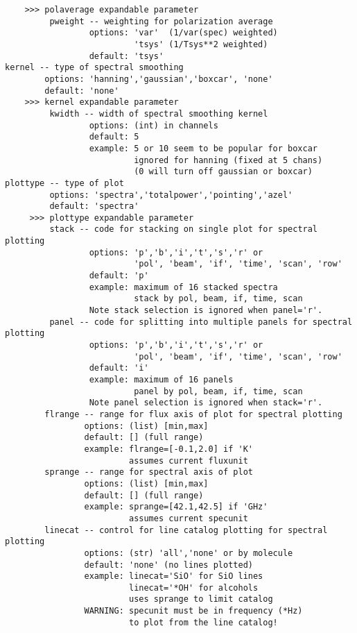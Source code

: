 \begin{verbatim}
    >>> polaverage expandable parameter
         pweight -- weighting for polarization average
                 options: 'var'  (1/var(spec) weighted)
                          'tsys' (1/Tsys**2 weighted)
                 default: 'tsys'
kernel -- type of spectral smoothing
        options: 'hanning','gaussian','boxcar', 'none'
        default: 'none'
    >>> kernel expandable parameter
         kwidth -- width of spectral smoothing kernel
                 options: (int) in channels
                 default: 5
                 example: 5 or 10 seem to be popular for boxcar
                          ignored for hanning (fixed at 5 chans)
                          (0 will turn off gaussian or boxcar)
plottype -- type of plot
         options: 'spectra','totalpower','pointing','azel'
         default: 'spectra'
     >>> plottype expandable parameter
         stack -- code for stacking on single plot for spectral plotting
                 options: 'p','b','i','t','s','r' or
                          'pol', 'beam', 'if', 'time', 'scan', 'row'
                 default: 'p'
                 example: maximum of 16 stacked spectra
                          stack by pol, beam, if, time, scan
                 Note stack selection is ignored when panel='r'.
         panel -- code for splitting into multiple panels for spectral plotting
                 options: 'p','b','i','t','s','r' or
                          'pol', 'beam', 'if', 'time', 'scan', 'row'
                 default: 'i'
                 example: maximum of 16 panels
                          panel by pol, beam, if, time, scan
                 Note panel selection is ignored when stack='r'.
        flrange -- range for flux axis of plot for spectral plotting
                options: (list) [min,max]
                default: [] (full range)
                example: flrange=[-0.1,2.0] if 'K'
                         assumes current fluxunit
        sprange -- range for spectral axis of plot
                options: (list) [min,max]
                default: [] (full range)
                example: sprange=[42.1,42.5] if 'GHz'
                         assumes current specunit
        linecat -- control for line catalog plotting for spectral plotting
                options: (str) 'all','none' or by molecule
                default: 'none' (no lines plotted)
                example: linecat='SiO' for SiO lines
                         linecat='*OH' for alcohols
                         uses sprange to limit catalog
                WARNING: specunit must be in frequency (*Hz)
                         to plot from the line catalog!

\end{verbatim}
